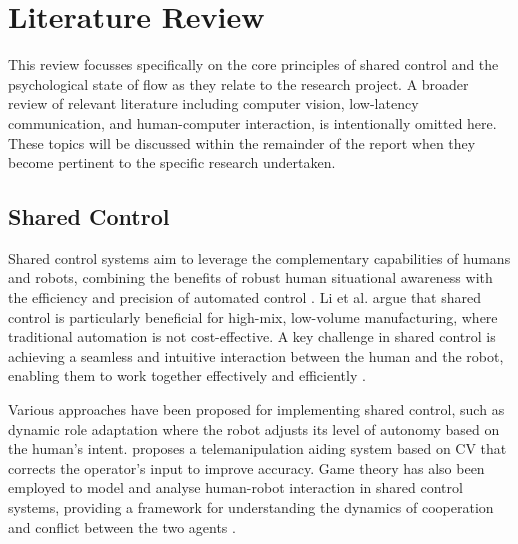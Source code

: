 \documentclass[12pt,british,UKenglish]{article}
\begin{document}
\section{Literature Review}\label{sec:Literature-Review}


This review focusses specifically on the core principles of shared control and the psychological state of flow as they relate to the research project.
A broader review of relevant literature including computer vision, low-latency communication, and human-computer interaction, is intentionally omitted here.
These topics will be discussed within the remainder of the report when they become pertinent to the specific research undertaken.

\subsection{Shared Control}
Shared control systems aim to leverage the complementary capabilities of humans and robots, combining the benefits of robust human situational awareness with the efficiency and precision of automated control \cite{Z.2022}.
Li et al. \cite{10.1109/TRO.2015.2419873} argue that shared control is particularly beneficial for high-mix, low-volume manufacturing, where traditional automation is not cost-effective.
A key challenge in shared control is achieving a seamless and intuitive interaction between the human and the robot, enabling them to work together effectively and efficiently \cite{10.1109/TRO.2015.2419873}.

Various approaches have been proposed for implementing shared control, such as dynamic role adaptation \cite{10.1109/TRO.2015.2419873} where the robot adjusts its level of autonomy based on the human's intent.
\cite{AMAT2002473} proposes a telemanipulation aiding system based on \acl*{CV} that corrects the operator's input to improve accuracy.
Game theory has also been employed to model and analyse human-robot interaction in shared control systems, providing a framework for understanding the dynamics of cooperation and conflict between the two agents \cite{10.1109/TRO.2015.2419873}.
\end{document}
